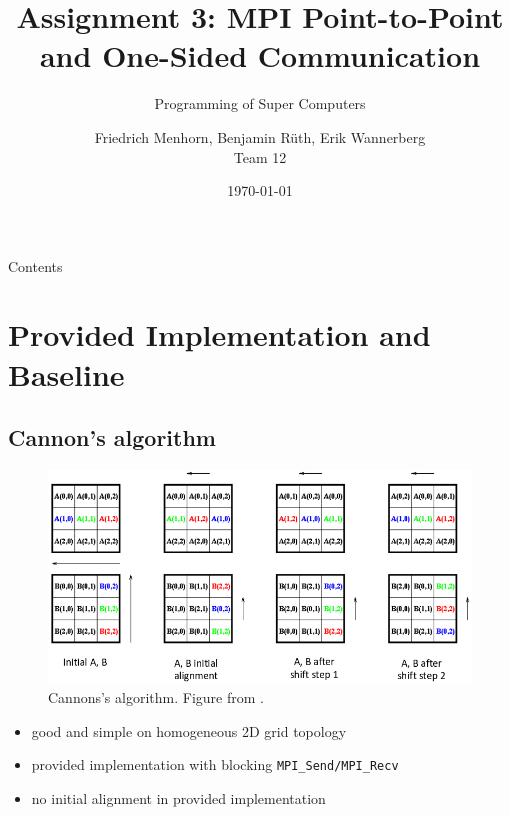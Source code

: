 \documentclass[9pt,pdftex]{beamer}
\title{Assignment 3: MPI Point-to-Point and One-Sided Communication}
\subtitle{Programming of Super Computers}
\author[Friedrich Menhorn, Benjamin Rüth, Erik Wannerberg] {Friedrich Menhorn, Benjamin Rüth, Erik Wannerberg \\ Team 12} %
\date{\today}
\institute{Technische Universität München}
\begin{document}
\frame{\maketitle}

\begin{frame}{Contents}
\tableofcontents
\end{frame}

\section{Provided Implementation and Baseline}
\begin{frame}{\phantom{Contents}}
\tableofcontents[
  currentsection  
]
\end{frame}

\subsection{Cannon’s algorithm}
\begin{frame}{\insertsubsection}
\begin{center}
\begin{figure}
\includegraphics[width=.65\textwidth]{Pictures/Cannon.png}
\caption{Cannons's algorithm. Figure from .}
\end{figure}
\end{center}
\begin{itemize}
\item good and simple on homogeneous 2D grid topology
\item provided implementation with blocking \lstinline{MPI_Send/MPI_Recv}
\item no initial alignment in provided implementation
\end{itemize}
\end{frame}
\end{document}
